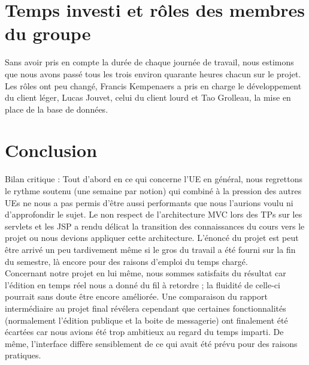 \documentclass[a4paper, 12pt]{article}
\begin{document}
\section{Temps investi et rôles des membres du groupe}

Sans avoir pris en compte la durée de chaque journée de travail, nous estimons que nous avons passé tous les trois environ quarante heures chacun sur le projet.
Les rôles ont peu changé, Francis Kempenaers a pris en charge le développement du client léger, Lucas Jouvet, celui du client lourd et Tao Grolleau, la mise en place de la base de données. 

\section{Conclusion}

Bilan critique : Tout d'abord en ce qui concerne l'UE en général, nous regrettons le rythme soutenu (une semaine par notion) qui combiné à la pression des autres UEs ne nous a pas permis d'être aussi performants que nous l'aurions voulu ni d'approfondir le sujet. Le non respect de l'architecture MVC lors des TPs sur les servlets et les JSP a rendu délicat la transition des connaissances du cours vers le projet ou nous devions appliquer cette architecture. L'énoncé du projet est peut être arrivé un peu tardivement même si le gros du travail a été fourni sur la fin du semestre, là encore pour des raisons d'emploi du temps chargé.
\\Concernant notre projet en lui même, nous sommes satisfaits du résultat car l'édition en temps réel nous a donné du fil à retordre ; la fluidité de celle-ci pourrait sans doute être encore améliorée. Une comparaison du rapport intermédiaire au projet final révélera cependant que certaines fonctionnalités (normalement l'édition publique et la boite de messagerie) ont finalement été écartées car nous avions été trop ambitieux au regard du temps imparti. De même, l'interface diffère sensiblement de ce qui avait été prévu pour des raisons pratiques.
\end{document}
